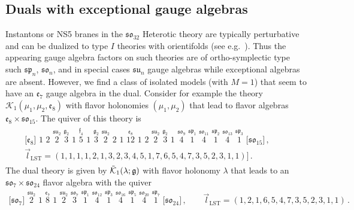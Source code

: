\documentclass[11pt]{article}
\numberwithin{equation}{section}
\newcommand{\fso}{\mathfrak{so}}
\newcommand{\LST}{\text{LST}\xspace}
\begin{document}
\subsection{Duals with exceptional gauge algebras}
Instantons or NS5 branes in the $\fso_{32}$ Heterotic theory are typically perturbative and can be dualized to type $I$ theories with orientifolds (see e.g.~\cite{DelZotto:2022ohj}). Thus the appearing gauge algebra factors on such theories are of ortho-symplectic type such $\mathfrak{sp}_n$, $\mathfrak{so}_n$, and in special cases $\mathfrak{su}_n$ gauge algebras while exceptional algebras are absent. However, we find a class of isolated models (with $M=1$) that seem to have an $\mathfrak{e}_{7}$ gauge algebra in the dual.
Consider for example the theory $\mathcal{K}_{1}(\mu_{1},\mu_{2},\mathfrak{e}_{8})$ with flavor holonomies $(\mu_{1},\mu_{2})$ that lead to flavor algebras $\mathfrak{e}_{8} \times \mathfrak{so}_{15}$. The quiver of this theory is
\begin{align}
\begin{split}
\lbrack  \mathfrak{e}_{8}\rbrack     \, \,   
1 \, \,   
2 \, \,  
{\overset{\mathfrak{su}_2}{2}} \, \,
{\overset{\mathfrak{g}_2}{3}} \, \,
1 \, \,
{\overset{\mathfrak{f}_4}{5}} \, \
1 \, \,
{\overset{\mathfrak{g}_2}{3}} \, \,
{\overset{\mathfrak{su}_2}{2}} \, \,
2 \, \,
1 \, \,
{\overset{\mathfrak{e}_8}{12}} \, \,
1 \, \,
2 \, \,
{\overset{\mathfrak{su}_{2}}{2}}  \, \,
{\overset{\mathfrak{g}_2}{3}} \, \, 
1 \, \,
{\overset{\mathfrak{so}_{9}}{4}} \, \,
{\overset{\mathfrak{sp}_1}{1}} \, \,
{\overset{\mathfrak{so}_{11}}{4}} \, \,
{\overset{\mathfrak{sp}_2}{1}} \, \,
{\overset{\mathfrak{so}_{13}}{4}} \, \,
{\overset{\mathfrak{sp}_3}{1}} \, \,
\lbrack \mathfrak{so}_{15} \rbrack   \, ,   \qquad \\
\vec{l}_{\LST}=(1,1,1,1,2,1,3,2,3,4,5,1,7,6,5,4,7,3,5,2,3,1,1) ]\,.\qquad\qquad~
\end{split}
\end{align}
The dual theory is given by $\mathcal{\Tilde{K}}_{1}(\lambda;\mathfrak{g})$ with flavor holonomy $\lambda$ that leads to an $\mathfrak{so}_{7}\times \mathfrak{so}_{24}$ flavor algebra with the quiver
\begin{align}
\lbrack  \mathfrak{so}_{7}\rbrack     \, \,   
{\overset{\mathfrak{su}_{2}}{2}}   \, \,  
1 \, \,
{\overset{\mathfrak{e}_7}{8}} \, \,
1 \, \,
{\overset{\mathfrak{su}_{2}}{2}} \, \, 
{\overset{\mathfrak{so}_{7}}{3}}  \, \,
{\overset{\mathfrak{sp}_{1}}{1}} \, \, 
{\overset{\mathfrak{so}_{12}}{4}} \, \, 
{\overset{\mathfrak{sp}_{3}}{1}} \, \, 
{\overset{\mathfrak{so}_{16}}{4}} \, \,
{\overset{\mathfrak{sp}_5}{1}} \, \,
{\overset{\mathfrak{so}_{20}}{4}} \, \,
{\overset{\mathfrak{sp}_7}{1}} \, \,
\lbrack \mathfrak{so}_{24} \rbrack   \, ,   \qquad 
\vec{l}_{\LST}=(1,2,1,6,5,4,7,3,5,2,3,1,1) \, . \nonumber
\end{align}
\end{document}
